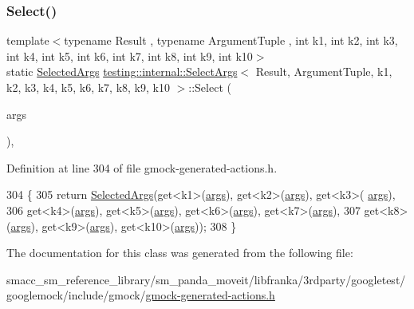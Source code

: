 \subsubsection{\texorpdfstring{Select()}{Select()}}
{\footnotesize\ttfamily template$<$typename Result , typename Argument\+Tuple , int k1, int k2, int k3, int k4, int k5, int k6, int k7, int k8, int k9, int k10$>$ \\
static \hyperlink{classtesting_1_1internal_1_1SelectArgs_ad1eaa794653b3f4cefdb5c2285b418a7}{Selected\+Args} \hyperlink{classtesting_1_1internal_1_1SelectArgs}{testing\+::internal\+::\+Select\+Args}$<$ Result, Argument\+Tuple, k1, k2, k3, k4, k5, k6, k7, k8, k9, k10 $>$\+::Select (\begin{DoxyParamCaption}\item[{const Argument\+Tuple \&}]{args }\end{DoxyParamCaption})\hspace{0.3cm}{\ttfamily [inline]}, {\ttfamily [static]}}



Definition at line 304 of file gmock-\/generated-\/actions.\+h.


\begin{DoxyCode}
304                                                         \{
305     \textcolor{keywordflow}{return} \hyperlink{classtesting_1_1internal_1_1SelectArgs_ad1eaa794653b3f4cefdb5c2285b418a7}{SelectedArgs}(get<k1>(\hyperlink{namespacegenerate__debs_a75f9143e38df82d83b2e8a6f99cae02c}{args}), get<k2>(\hyperlink{namespacegenerate__debs_a75f9143e38df82d83b2e8a6f99cae02c}{args}), get<k3>(
      \hyperlink{namespacegenerate__debs_a75f9143e38df82d83b2e8a6f99cae02c}{args}),
306         get<k4>(\hyperlink{namespacegenerate__debs_a75f9143e38df82d83b2e8a6f99cae02c}{args}), get<k5>(\hyperlink{namespacegenerate__debs_a75f9143e38df82d83b2e8a6f99cae02c}{args}), get<k6>(\hyperlink{namespacegenerate__debs_a75f9143e38df82d83b2e8a6f99cae02c}{args}), get<k7>(\hyperlink{namespacegenerate__debs_a75f9143e38df82d83b2e8a6f99cae02c}{args}),
307         get<k8>(\hyperlink{namespacegenerate__debs_a75f9143e38df82d83b2e8a6f99cae02c}{args}), get<k9>(\hyperlink{namespacegenerate__debs_a75f9143e38df82d83b2e8a6f99cae02c}{args}), get<k10>(\hyperlink{namespacegenerate__debs_a75f9143e38df82d83b2e8a6f99cae02c}{args}));
308   \}
\end{DoxyCode}


The documentation for this class was generated from the following file\+:\begin{DoxyCompactItemize}
\item 
smacc\+\_\+sm\+\_\+reference\+\_\+library/sm\+\_\+panda\+\_\+moveit/libfranka/3rdparty/googletest/googlemock/include/gmock/\hyperlink{gmock-generated-actions_8h}{gmock-\/generated-\/actions.\+h}\end{DoxyCompactItemize}
